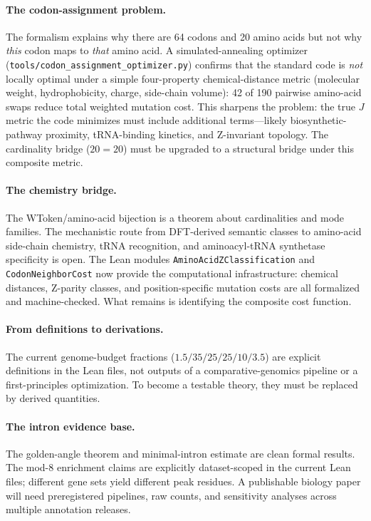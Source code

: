 \documentclass[11pt,a4paper]{article}
\newcommand{\Jcost}{J}
\begin{document}
\paragraph{The codon-assignment problem.}
The formalism explains why there are 64 codons and 20 amino acids but not why \emph{this} codon maps to \emph{that} amino acid. A simulated-annealing optimizer (\texttt{tools/codon\_assignment\_optimizer.py}) confirms that the standard code is \emph{not} locally optimal under a simple four-property chemical-distance metric (molecular weight, hydrophobicity, charge, side-chain volume): 42 of 190 pairwise amino-acid swaps reduce total weighted mutation cost.  This sharpens the problem: the true $\Jcost$ metric the code minimizes must include additional terms---likely biosynthetic-pathway proximity, tRNA-binding kinetics, and Z-invariant topology.  The cardinality bridge ($20 = 20$) must be upgraded to a structural bridge under this composite metric.

\paragraph{The chemistry bridge.}
The WToken/amino-acid bijection is a theorem about cardinalities and mode families. The mechanistic route from DFT-derived semantic classes to amino-acid side-chain chemistry, tRNA recognition, and aminoacyl-tRNA synthetase specificity is open.  The Lean modules \texttt{AminoAcidZClassification} and \texttt{CodonNeighborCost} now provide the computational infrastructure: chemical distances, Z-parity classes, and position-specific mutation costs are all formalized and machine-checked.  What remains is identifying the composite cost function.

\paragraph{From definitions to derivations.}
The current genome-budget fractions ($1.5/35/25/25/10/3.5$) are explicit definitions in the Lean files, not outputs of a comparative-genomics pipeline or a first-principles optimization. To become a testable theory, they must be replaced by derived quantities.

\paragraph{The intron evidence base.}
The golden-angle theorem and minimal-intron estimate are clean formal results. The mod-8 enrichment claims are explicitly dataset-scoped in the current Lean files; different gene sets yield different peak residues. A publishable biology paper will need preregistered pipelines, raw counts, and sensitivity analyses across multiple annotation releases.
\end{document}
